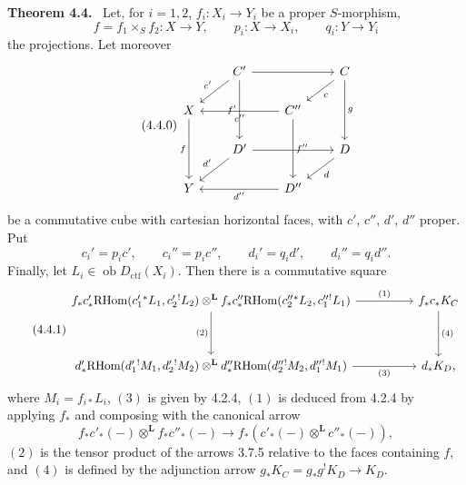 \documentclass[11pt]{article}
\newenvironment{statement}[1]{\par\medskip\noindent\textbf{#1.}\ }{\par\medskip}
\newcommand{\ob}{\operatorname{ob}}
\providecommand{\RHom}{\mathrm{RHom}}
\providecommand{\Dctf}{D_{\mathrm{ctf}}}
\providecommand{\Dctf}{D_{\mathrm{ctf}}}
\providecommand{\RHom}{\mathrm{RHom}}
\providecommand{\ob}{\operatorname{ob}}
\providecommand{\RHom}{\mathrm R\mathcal{H}om}
\begin{document}
\begin{statement}{Theorem 4.4}
Let, for $i=1,2$, $f_i:X_i\longrightarrow Y_i$ be a proper $S$-morphism,
\[
f=f_1\times_S f_2:X\longrightarrow Y,\qquad
p_i:X\longrightarrow X_i,\qquad q_i:Y\longrightarrow Y_i
\]
the projections. Let moreover
\begin{equation}
\tag{4.4.0}
\begin{tikzcd}[column sep=2.1em,row sep=1.6em]
& C' \arrow[rr] \arrow[dl,"c'"'] \arrow[dd,"f'"'] && C \arrow[dl,"c"] \arrow[dd,"g"] \\
X \arrow[dd,"f"'] && C'' \arrow[ll,"c''"] \arrow[dd,"f''"] \\
& D' \arrow[rr] \arrow[dl,"d'"'] && D \arrow[dl,"d"] \\
Y && D'' \arrow[ll,"d''"]
\end{tikzcd}
\end{equation}
be a commutative cube with cartesian horizontal faces, with $c'$, $c''$, $d'$, $d''$ proper. Put
\[
c_i'=p_i c',\qquad c_i''=p_i c'',\qquad d_i'=q_i d',\qquad d_i''=q_i d''.
\]
Finally, let $L_i\in\ob \Dctf(X_i)$. Then there is a commutative square
\begin{equation}
\tag{4.4.1}
\begin{tikzcd}[column sep=huge,row sep=huge]
f_*c'_*\RHom(c_1'{}^*L_1,c_2'{}^!L_2)\otimes^{\mathbf L}
f_*c''_*\RHom(c_2''{}^*L_2,c_1''{}^!L_1)
 \arrow[r,"(1)"] \arrow[d,"(2)"'] &
f_*c_*K_C \arrow[d,"(4)"] \\
d'_*\RHom(d_1'{}^!M_1,d_2'{}^!M_2)\otimes^{\mathbf L}
d''_*\RHom(d_2''{}^!M_2,d_1''{}^!M_1)
 \arrow[r,"(3)"'] &
d_*K_D ,
\end{tikzcd}
\end{equation}
where $M_i=f_{i*}L_i$, $(3)$ is given by 4.2.4, $(1)$ is deduced from 4.2.4 by applying $f_*$ and composing with the canonical arrow
\[
f_*c'_*(-)\otimes^{\mathbf L} f_*c''_*(-)\longrightarrow f_*(c'_*(-)\otimes^{\mathbf L}c''_*(-)),
\]
$(2)$ is the tensor product of the arrows 3.7.5 relative to the faces containing $f$, and $(4)$ is defined by the adjunction arrow $g_*K_C=g_*g^!K_D\longrightarrow K_D$.
\end{statement}
\end{document}
